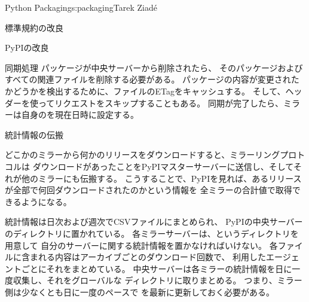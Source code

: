 \begin{aosachapter}{Python Packaging}{s:packaging}{Tarek Ziad\'{e}}
\begin{aosasect1}{標準規約の改良}
\begin{aosasect2}{PyPIの改良}
\begin{aosasect3}{同期処理}
パッケージが中央サーバーから削除されたら、
そのパッケージおよびすべての関連ファイルを削除する必要がある。
パッケージの内容が変更されたかどうかを検出するために、ファイルのETagをキャッシュする。
そして、ヘッダーを使ってリクエストをスキップすることもある。
同期が完了したら、ミラーは自身のを現在日時に設定する。

\end{aosasect3}

\begin{aosasect3}{統計情報の伝搬}

どこかのミラーから何かのリリースをダウンロードすると、ミラーリングプロトコルは
ダウンロードがあったことをPyPIマスターサーバーに送信し、そしてそれが他のミラーにも伝搬する。
こうすることで、PyPIを見れば、あるリリースが全部で何回ダウンロードされたのかという情報を
全ミラーの合計値で取得できるようになる。

統計情報は日次および週次でCSVファイルにまとめられ、
PyPIの中央サーバーのディレクトリに置かれている。
各ミラーサーバーは、というディレクトリを用意して
自分のサーバーに関する統計情報を置かなければいけない。
各ファイルに含まれる内容はアーカイブごとのダウンロード回数で、
利用したエージェントごとにそれをまとめている。
中央サーバーは各ミラーの統計情報を日に一度収集し、それをグローバルな
ディレクトリに取りまとめる。
つまり、ミラー側は少なくとも日に一度のペースで
を最新に更新しておく必要がある。


\end{aosasect3}
\end{aosasect2}
\end{aosasect1}
\end{aosachapter}
